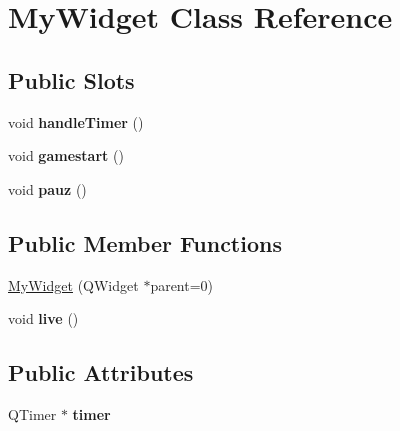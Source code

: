 \hypertarget{classMyWidget}{\section{\-My\-Widget \-Class \-Reference}
\label{classMyWidget}
}
\subsection*{\-Public \-Slots}
\begin{DoxyCompactItemize}
\item 
\hypertarget{classMyWidget_a7fe115a58a90c7ab2fcd9a53f22a5480}{void {\bfseries handle\-Timer} ()}\label{classMyWidget_a7fe115a58a90c7ab2fcd9a53f22a5480}

\item 
\hypertarget{classMyWidget_ac865162c8fd0a248ff3c898acf44346a}{void {\bfseries gamestart} ()}\label{classMyWidget_ac865162c8fd0a248ff3c898acf44346a}

\item 
\hypertarget{classMyWidget_af010626705546e924ce283a7b1a29f44}{void {\bfseries pauz} ()}\label{classMyWidget_af010626705546e924ce283a7b1a29f44}

\end{DoxyCompactItemize}
\subsection*{\-Public \-Member \-Functions}
\begin{DoxyCompactItemize}
\item 
\hyperlink{classMyWidget_a228e0cdad7acf281b07d50f131ce126b}{\-My\-Widget} (\-Q\-Widget $\ast$parent=0)
\item 
\hypertarget{classMyWidget_a4524740a902212a980aa6418a5ead60a}{void {\bfseries live} ()}\label{classMyWidget_a4524740a902212a980aa6418a5ead60a}

\end{DoxyCompactItemize}
\subsection*{\-Public \-Attributes}
\begin{DoxyCompactItemize}
\item 
\hypertarget{classMyWidget_a923b117544cec8aff3fb8cc50fe6853a}{\-Q\-Timer $\ast$ {\bfseries timer}}\label{classMyWidget_a923b117544cec8aff3fb8cc50fe6853a}

\end{DoxyCompactItemize}

